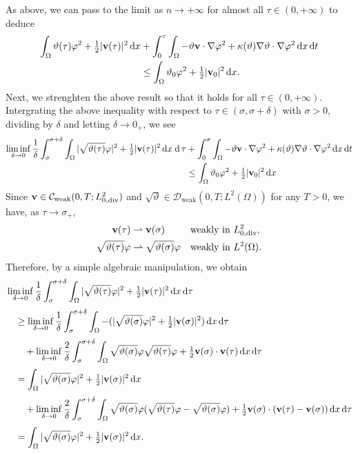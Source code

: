 \documentclass[11pt, a4paper, reqno]{amsart}
\numberwithin{equation}{section}
\newcommand{\diver}{\operatorname{div}}
\newcommand{\vc}[1]{{\bf #1}}
\newcommand{\vv}{\vc{v}}
\newcommand{\thet}{\vartheta}
\newcommand{\dt}{\,{\rm d} t }
\newcommand{\dd}{\,{\rm d} }
\newcommand{\dx}{\,{\rm d} {x}}
\newcommand{\dxdt}{\dx  \dt}
\newcommand{\intO}[1]{\int_{\Omega} #1 \dx}
\newcommand{\inttO}[1]{\int_0^{\tau} \int_{\Omega} #1 \dxdt}
\begin{document}
As above, we can pass to the limit as $n \to +\infty$ for almost all $\tau \in (0,+\infty)$ to deduce 
\begin{equation}\label{local-st}
\begin{split}
\intO{\thet(\tau)\varphi^2+\tfrac12|\vv(\tau)|^2}
&+\inttO{-\thet\vv \cdot\nabla\varphi^2+\kappa(\thet)\nabla\thet \cdot \nabla\varphi^2}\\
&\leq\intO{\thet_0\varphi^2+\tfrac12|\vv_0|^2}.
\end{split}
\end{equation}
Next, we strenghten the above result so that it holds for all $\tau \in (0,+\infty)$. Intergrating the above inequality with respect to $\tau \in (\sigma, \sigma+\delta)$ with $\sigma>0$, dividing by $\delta$ and letting $\delta \to 0_+$, we see
\begin{equation*}\begin{split}
\liminf_{\delta \to 0} \frac{1}{\delta}\int_\sigma^{\sigma+\delta}\intO{|\sqrt{\thet(\tau)}\varphi|^2+\tfrac12|\vv(\tau)|^2}\; {\rm d}\, \tau
&+\int_0^\sigma\intO{-\thet\vv \cdot\nabla\varphi^2+\kappa(\thet)\nabla\thet \cdot \nabla\varphi^2}\dd t\\
&\leq\intO{\thet_0\varphi^2+\tfrac12|\vv_0|^2}
\end{split}
\end{equation*}
Since $\vv \in \mathcal{C}_{\textrm{weak}}(0,T; L^2_{0,\diver})$ and $\sqrt{\thet} \in \mathcal{D}_{\textrm{weak}}(0,T; L^2(\Omega))$ for any $T>0$, we have, as $\tau\to \sigma_+$,  
$$
\begin{aligned}
\vv(\tau) &\rightharpoonup \vv(\sigma) &&\textrm{weakly in } L^2_{0,\diver},\\
\sqrt{\thet(\tau)}\varphi &\rightharpoonup \sqrt{\thet(\sigma)}\varphi &&\textrm{weakly in } L^2(\Omega).
\end{aligned}
$$
Therefore, by a simple algebraic manipulation, we obtain
$$
\begin{aligned}
&\liminf_{\delta \to 0} \frac{1}{\delta}\int_\sigma^{\sigma+\delta}\intO{|\sqrt{\thet(\tau)}\varphi|^2+\tfrac12|\vv(\tau)|^2}\, {\rm d}\tau \\[0.3em]
&\quad \ge \liminf_{\delta \to 0} \frac{1}{\delta}\int_\sigma^{\sigma+\delta}\intO{-(|\sqrt{\thet(\sigma)}\varphi|^2+\tfrac12|\vv(\sigma)|^2)}\, {\rm d}\tau \\[0.3em]
&\qquad+\liminf_{\delta \to 0} \frac{2}{\delta}\int_\sigma^{\sigma+\delta}\intO{\sqrt{\thet(\sigma)}\varphi\sqrt{\thet(\tau)}\varphi+\tfrac12\vv(\sigma)\cdot \vv(\tau)}\, {\rm d}\tau\\[0.3em]
&\quad = \intO{|\sqrt{\thet(\sigma)}\varphi|^2+\tfrac12|\vv(\sigma)|^2} \\[0.3em]
&\qquad+\liminf_{\delta \to 0} \frac{2}{\delta}\int_\sigma^{\sigma+\delta}\intO{\sqrt{\thet(\sigma)}\varphi(\sqrt{\thet(\tau)}\varphi-\sqrt{\thet(\sigma)}\varphi) +\tfrac12\vv(\sigma)\cdot (\vv(\tau)-\vv(\sigma))}\, {\rm d}\tau\\[0.3em]
&\quad = \intO{|\sqrt{\thet(\sigma)}\varphi|^2+\tfrac12|\vv(\sigma)|^2}.
\end{aligned}
$$
\end{document}
